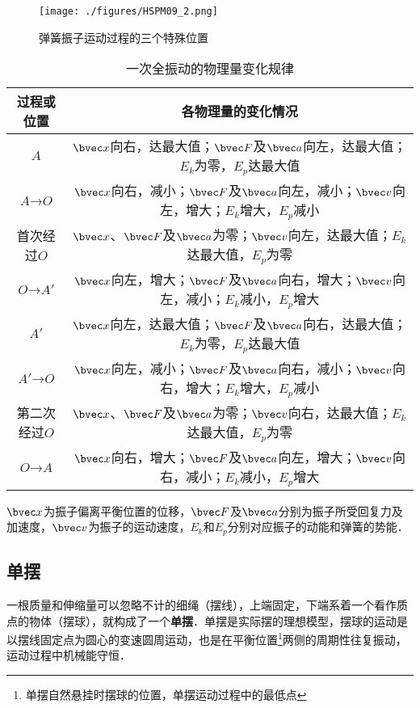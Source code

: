 \begin{figure}[ht]
\centering
\texttt{[image: ./figures/HSPM09\_2.png]}
\caption{弹簧振子运动过程的三个特殊位置} \label{HSPM09_fig2}
\end{figure}

\begin{table}[ht]
\centering
\caption{一次全振动的物理量变化规律}\label{HSPM09_tab1}
\begin{tabular}{|c|c|}
\hline
过程或位置 & 各物理量的变化情况 \\
\hline
$A$ & $\bvec x$向右，达最大值；$\bvec F$及$\bvec a$向左，达最大值；$E_k$为零，$E_p$达最大值 \\
\hline
$A$→$O$ & $\bvec x$向右，减小；$\bvec F$及$\bvec a$向左，减小；$\bvec v$向左，增大；$E_k$增大，$E_p$减小 \\
\hline
首次经过$O$ & $\bvec x$、$\bvec F$及$\bvec a$为零；$\bvec v$向左，达最大值；$E_k$达最大值，$E_p$为零 \\
\hline
$O$→$A'$ & $\bvec x$向左，增大；$\bvec F$及$\bvec a$向右，增大；$\bvec v$向左，减小；$E_k$减小，$E_p$增大 \\
\hline
$A'$ & $\bvec x$向左，达最大值；$\bvec F$及$\bvec a$向右，达最大值；$E_k$为零，$E_p$达最大值 \\
\hline
$A'$→$O$ & $\bvec x$向左，减小；$\bvec F$及$\bvec a$向右，减小；$\bvec v$向右，增大；$E_k$增大，$E_p$减小 \\
\hline
第二次经过$O$ & $\bvec x$、$\bvec F$及$\bvec a$为零；$\bvec v$向右，达最大值；$E_k$达最大值，$E_p$为零 \\
\hline
$O$→$A$ & $\bvec x$向右，增大；$\bvec F$及$\bvec a$向左，增大；$\bvec v$向右，减小；$E_k$减小，$E_p$增大 \\
\hline
\end{tabular}
\end{table}
$\bvec x$为振子偏离平衡位置的位移，$\bvec F$及$\bvec a$分别为振子所受回复力及加速度，$\bvec v$为振子的运动速度，$E_k$和$E_p$分别对应振子的动能和弹簧的势能．


\subsection{单摆}

一根质量和伸缩量可以忽略不计的细绳（摆线），上端固定，下端系着一个看作质点的物体（摆球），就构成了一个\textbf{单摆}．单摆是实际摆的理想模型，摆球的运动是以摆线固定点为圆心的变速圆周运动，也是在平衡位置\footnote{单摆自然悬挂时摆球的位置，单摆运动过程中的最低点}两侧的周期性往复振动，运动过程中机械能守恒．

